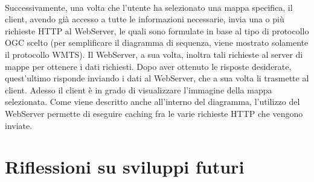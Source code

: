 \\Successivamente, una volta che l'utente ha selezionato una mappa specifica, il client, avendo già accesso a tutte le informazioni necessarie, invia una o più richieste HTTP al WebServer, le quali sono formulate in base al tipo di protocollo OGC scelto (per semplificare il diagramma di sequenza, viene mostrato solamente il protocollo WMTS).
Il WebServer, a sua volta, inoltra tali richieste al server di mappe per ottenere i dati richiesti. Dopo aver ottenuto le risposte desiderate, quest'ultimo risponde inviando i dati al WebServer, che a sua volta li trasmette al client. Adesso il client è in grado di visualizzare l'immagine della mappa selezionata. Come viene descritto anche all'interno del diagramma, l'utilizzo del WebServer permette di eseguire caching fra le varie richieste HTTP che vengono inviate.

\section{Riflessioni su sviluppi futuri}

